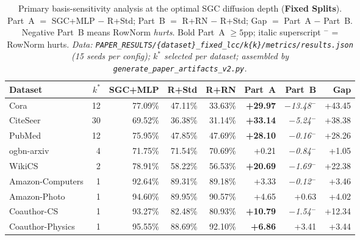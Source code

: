 \documentclass[11pt]{article}
\begin{document}
\begin{table}[H]
\centering\small\setlength{\tabcolsep}{5pt}
\caption{Primary basis-sensitivity analysis at the optimal SGC diffusion depth
(\textbf{Fixed Splits}).  Part~A $=$ SGC+MLP $-$ R+Std; Part~B $=$ R+RN $-$ R+Std;
Gap $=$ Part~A $-$ Part~B.  Negative Part~B means RowNorm \emph{hurts}.
Bold Part~A $\geq 5$pp; italic superscript $^-$ = RowNorm hurts.
\textit{\scriptsize Data: \texttt{PAPER\_RESULTS/\{dataset\}\_fixed\_lcc/k\{k\}/metrics/results.json}
(15 seeds per config); $k^*$ selected per dataset; assembled by \texttt{generate\_paper\_artifacts\_v2.py}.}}
\label{tab:primary_analysis_fixed}
\begin{tabular}{lrrrrrrr}
\toprule
Dataset & $k^*$ & SGC+MLP & R+Std & R+RN & Part~A & Part~B & Gap \\
\midrule
Cora                 &  12 & 77.09\% & 47.11\% & 33.63\% & \textbf{+29.97} & \textit{$-$13.48}$^-$ & +43.45 \\
CiteSeer             &  30 & 69.52\% & 36.38\% & 31.14\% & \textbf{+33.14} & \textit{$-$5.24}$^-$ & +38.38 \\
PubMed               &  12 & 75.95\% & 47.85\% & 47.69\% & \textbf{+28.10} & \textit{$-$0.16}$^-$ & +28.26 \\
ogbn-arxiv           &   4 & 71.75\% & 71.54\% & 70.69\% & +0.21 & \textit{$-$0.84}$^-$ & +1.05 \\
WikiCS               &   2 & 78.91\% & 58.22\% & 56.53\% & \textbf{+20.69} & \textit{$-$1.69}$^-$ & +22.38 \\
Amazon-Computers     &   1 & 92.64\% & 89.31\% & 89.18\% & +3.33 & \textit{$-$0.12}$^-$ & +3.46 \\
Amazon-Photo         &   1 & 94.60\% & 89.95\% & 90.57\% & +4.65 & +0.63 & +4.02 \\
Coauthor-CS          &   1 & 93.27\% & 82.48\% & 80.93\% & \textbf{+10.79} & \textit{$-$1.54}$^-$ & +12.34 \\
Coauthor-Physics     &   1 & 95.55\% & 88.69\% & 92.10\% & \textbf{+6.86} & +3.41 & +3.44 \\
\bottomrule
\end{tabular}
\end{table}
\end{document}
